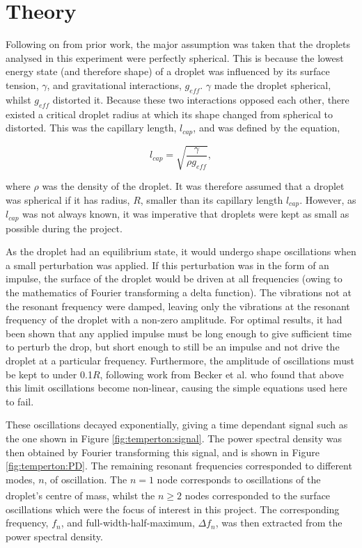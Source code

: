 \documentclass{physics_article_B}
\begin{document}
\section{Theory\label{sect:theory}}

    Following on from prior work, the major assumption was taken that the droplets analysed in this experiment were perfectly spherical. This is because the lowest energy state (and therefore shape) of a droplet was influenced by its surface tension, $\gamma$, and gravitational interactions, $g_{eff}$. $\gamma$ made the droplet spherical, whilst $g_{eff}$ distorted it. Because these two interactions opposed each other, there existed a critical droplet radius at which its shape changed from spherical to distorted. This was the capillary length, $l_{cap}$, and was defined by the equation\cite{temperton},
        
        \begin{equation} 
        \label{eq:lcap}
            l_{cap} = \sqrt{\frac{\gamma }{\rho g_{eff} }}, 
        \end{equation}
    
    where $\rho$ was the density of the droplet. It was therefore assumed that a droplet was spherical if it has radius, $R$, smaller than its capillary length $l_{cap}$. However, as $l_{cap}$ was not always known, it was imperative that droplets were kept as small as possible during the project. 

    As the droplet had an equilibrium state, it would undergo shape oscillations when a small perturbation was applied\cite{oscillate}. If this perturbation was in the form of an impulse, the surface of the droplet would be driven at all frequencies (owing to the mathematics of Fourier transforming a delta function). The vibrations not at the resonant frequency were damped, leaving only the vibrations at the resonant frequency of the droplet with a non-zero amplitude. For optimal results, it had been shown that any applied impulse must be long enough to give sufficient time to perturb the drop, but short enough to still be an impulse and not drive the droplet at a particular frequency\cite{temperton}. Furthermore, the amplitude of oscillations must be kept to under 0.1$R$, following work from Becker et al. who found that above this limit oscillations become non-linear, causing the simple equations used here to fail\cite{becker}.
    
    These oscillations decayed exponentially, giving a time dependant signal such as the one shown in Figure \ref{fig:temperton:signal}. The power spectral density was then obtained by Fourier transforming this signal, and is shown in Figure \ref{fig:temperton:PD}. The remaining resonant frequencies corresponded to different modes, $n$, of oscillation. The $n=1$ node corresponds to oscillations of the droplet's centre of mass\textsuperscript{\cite{miller}}, whilst the $n\geq2$ nodes corresponded to the surface oscillations which were the focus of interest in this project. The corresponding frequency, $f_n$, and full-width-half-maximum, $\Delta f_n$, was then extracted from the power spectral density. 
\end{document}
